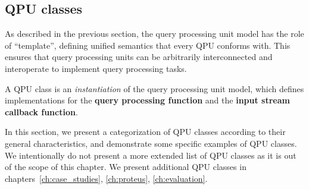 
\subsection{QPU classes}
\label{sec:qpu_classes}

As described in the previous section, the query processing unit model has the role of ``template'',
defining unified semantics that every QPU conforms with.
This ensures that query processing units can be arbitrarily interconnected and interoperate to implement query processing
tasks.

A QPU class is an \textit{instantiation} of the query processing unit model, which defines implementations for
the \textbf{query processing function} and the \textbf{input stream callback function}.

In this section, we present a categorization of QPU classes according to their general characteristics,
and demonstrate some specific examples of QPU classes.
We intentionally do not present a more extended list of QPU classes as it is out of the scope of this chapter.
We present additional QPU classes in chapters~\ref{ch:case_studies}, \ref{ch:proteus}, \ref{ch:evaluation}.

